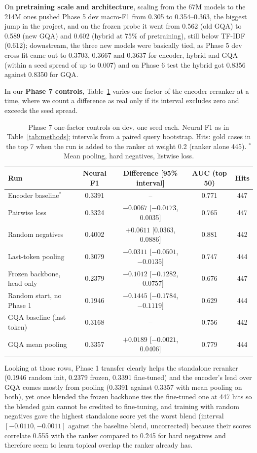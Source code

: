 \documentclass[11pt, oneside]{article}
\begin{document}
On \textbf{pretraining scale and architecture}, scaling from the 67M models to the 214M ones pushed Phase 5 dev macro-F1 from 0.305 to 0.354--0.363, the biggest jump in the project, and on the frozen probe it went from 0.562 (old GQA) to 0.589 (new GQA) and 0.602 (hybrid at 75\% of pretraining), still below TF-IDF (0.612); downstream, the three new models were basically tied, as Phase 5 dev cross-fit came out to 0.3703, 0.3667 and 0.3637 for encoder, hybrid and GQA (within a seed spread of up to 0.007) and on Phase 6 test the hybrid got 0.8356 against 0.8350 for GQA.

In our \textbf{Phase 7 controls}, Table~\ref{tab:p7controls} varies one factor of the encoder reranker at a time, where we count a difference as real only if its interval excludes zero and exceeds the seed spread.

\begin{table}[H]
\centering\footnotesize
\caption{Phase 7 one-factor controls on dev, one seed each. Neural F1 as in Table~\ref{tab:methods}; intervals from a paired query bootstrap. Hits: gold cases in the top 7 when the run is added to the ranker at weight 0.2 (ranker alone 445). $^\ast$Mean pooling, hard negatives, listwise loss.}
\label{tab:p7controls}
\begin{tabular}{lcccc}
\toprule
Run & Neural F1 & Difference [95\% interval] & AUC (top 50) & Hits \\
\midrule
Encoder baseline$^\ast$ & 0.3391 & -- & 0.771 & 447 \\
Pairwise loss & 0.3324 & $-0.0067$ [$-0.0173$, 0.0035] & 0.765 & 447 \\
Random negatives & 0.4002 & $+0.0611$ [0.0363, 0.0886] & 0.881 & 442 \\
Last-token pooling & 0.3079 & $-0.0311$ [$-0.0501$, $-0.0135$] & 0.747 & 444 \\
Frozen backbone, head only & 0.2379 & $-0.1012$ [$-0.1282$, $-0.0757$] & 0.676 & 447 \\
Random start, no Phase 1 & 0.1946 & $-0.1445$ [$-0.1784$, $-0.1119$] & 0.629 & 444 \\
\midrule
GQA baseline (last token) & 0.3168 & -- & 0.756 & 442 \\
GQA mean pooling & 0.3357 & $+0.0189$ [$-0.0021$, 0.0406] & 0.779 & 444 \\
\bottomrule
\end{tabular}
\end{table}

\noindent Looking at those rows, Phase 1 transfer clearly helps the standalone reranker (0.1946 random init, 0.2379 frozen, 0.3391 fine-tuned) and the encoder's lead over GQA comes mostly from pooling (0.3391 against 0.3357 with mean pooling on both), yet once blended the frozen backbone ties the fine-tuned one at 447 hits so the blended gain cannot be credited to fine-tuning, and training with random negatives gave the highest standalone score yet the worst blend (interval $[-0.0110, -0.0011]$ against the baseline blend, uncorrected) because their scores correlate 0.555 with the ranker compared to 0.245 for hard negatives and therefore seem to learn topical overlap the ranker already has.
\end{document}
